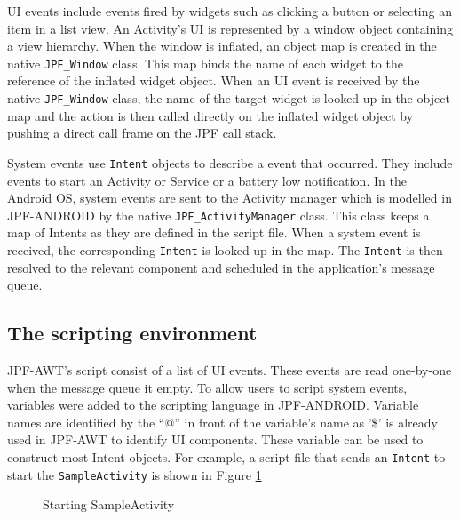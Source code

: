 \documentclass{acm_proc_article-sp}
\begin{document}
UI events include events fired by widgets such as clicking a button or selecting an item in a list view. An
Activity's UI is represented by a window object containing a view hierarchy. When the window is inflated, an object map is created in the
native \texttt{JPF\_Window} class. This map binds the name of each widget to the reference of the inflated widget object. When an UI event
is received by the native \texttt{JPF\_Window} class, the name of the target widget is looked-up in the object map and the action is then
called directly on the inflated widget object by pushing a direct call frame on the JPF call stack. 

System events use \texttt{Intent} objects to describe a event that occurred. They include events to start an Activity or Service or a
battery low notification. In the Android OS, system events are sent to the Activity manager which is modelled in JPF-ANDROID by the native
\texttt{JPF\_ActivityManager} class. This class keeps a map of Intents as they are defined in the script file. When a system event is
received, the corresponding \texttt{Intent} is looked up in the map. The \texttt{Intent} is then resolved to the relevant
component and scheduled in the application's message queue.

\subsection{The scripting environment}
JPF-AWT's script consist of a list of UI events. These events are read one-by-one when the message queue it empty. To allow users to
script system events, variables were added to the scripting language in JPF-ANDROID. Variable names are identified by the ``@'' in front of
the variable's name as '\$' is already used in JPF-AWT to identify UI components. These variable can be used to construct most Intent
objects. For example, a script file that sends an \texttt{Intent} to start the \texttt{SampleActivity} is shown in Figure \ref{fig:start}
\begin{figure}
\vspace{-18pt}
\caption{Starting SampleActivity}
\label{fig:start}
\end{figure}
\end{document}
